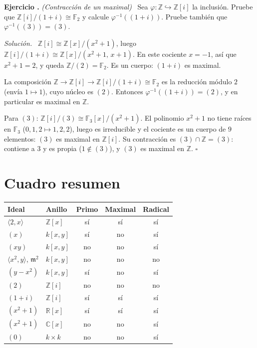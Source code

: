\documentclass[11pt,a4paper]{article}
\newcommand{\ZZ}{\mathbb{Z}}
\newcommand{\RR}{\mathbb{R}}
\newcommand{\CC}{\mathbb{C}}
\newcommand{\FF}{\mathbb{F}}
\newcommand{\gen}[1]{\langle #1\rangle}
\newcommand{\mm}{\mathfrak{m}}
\theoremstyle{definition}
\newcounter{ej}
\newenvironment{ejercicio}[1]{\refstepcounter{ej}\par\bigskip\noindent\textbf{Ejercicio \theej.} \emph{(#1)}\ }{\par}
\newenvironment{solucion}{\par\smallskip\noindent\textit{Solución.}\ }{\hfill$\square$\par}
\begin{document}
\begin{ejercicio}{Contracción de un maximal}
Sea $\varphi:\ZZ\hookrightarrow\ZZ[i]$ la inclusión. Pruebe que $\ZZ[i]/(1+i)\cong\FF_2$ y calcule $\varphi^{-1}((1+i))$. Pruebe también que $\varphi^{-1}((3))=(3)$.
\end{ejercicio}
\begin{solucion}
$\ZZ[i]\cong\ZZ[x]/(x^2+1)$, luego $\ZZ[i]/(1+i)\cong\ZZ[x]/(x^2+1,\,x+1)$. En este cociente $x=-1$, así que $x^2+1=2$, y queda $\ZZ/(2)=\FF_2$. Es un cuerpo: $(1+i)$ es maximal.

La composición $\ZZ\to\ZZ[i]\to\ZZ[i]/(1+i)\cong\FF_2$ es la reducción módulo $2$ (envía $1\mapsto1$), cuyo núcleo es $(2)$. Entonces $\varphi^{-1}((1+i))=(2)$, y en particular es maximal en $\ZZ$.

Para $(3)$: $\ZZ[i]/(3)\cong\FF_3[x]/(x^2+1)$. El polinomio $x^2+1$ no tiene raíces en $\FF_3$ ($0,1,2\mapsto1,2,2$), luego es irreducible y el cociente es un cuerpo de $9$ elementos: $(3)$ es maximal en $\ZZ[i]$. Su contracción es $(3)\cap\ZZ=(3)$: contiene a $3$ y es propia ($1\notin(3)$), y $(3)$ es maximal en $\ZZ$.
\end{solucion}

\section*{Cuadro resumen}

\begin{center}
\small
\begin{tabular}{@{}llccc@{}}
\toprule
Ideal & Anillo & Primo & Maximal & Radical \\
\midrule
$\gen{2,x}$ & $\ZZ[x]$ & sí & sí & sí \\
$(x)$ & $k[x,y]$ & sí & no & sí \\
$(xy)$ & $k[x,y]$ & no & no & sí \\
$\gen{x^2,y}$, $\mm^2$ & $k[x,y]$ & no & no & no \\
$(y-x^2)$ & $k[x,y]$ & sí & no & sí \\
$(2)$ & $\ZZ[i]$ & no & no & no \\
$(1+i)$ & $\ZZ[i]$ & sí & sí & sí \\
$(x^2+1)$ & $\RR[x]$ & sí & sí & sí \\
$(x^2+1)$ & $\CC[x]$ & no & no & sí \\
$(0)$ & $k\times k$ & no & no & sí \\
\bottomrule
\end{tabular}
\end{center}
\end{document}
